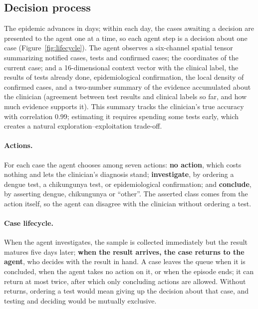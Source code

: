 \documentclass[11pt,a4paper]{article}
\begin{document}
\subsection{Decision process}
\label{subsec:mdp}

The epidemic advances in days; within each day, the cases awaiting a decision are presented to the agent one at a time, so each agent step is a decision about one case (Figure~\ref{fig:lifecycle}). The agent observes a six-channel spatial tensor summarizing notified cases, tests and confirmed cases; the coordinates of the current case; and a 16-dimensional context vector with the clinical label, the results of tests already done, epidemiological confirmation, the local density of confirmed cases, and a two-number summary of the evidence accumulated about the clinician (agreement between test results and clinical labels so far, and how much evidence supports it). This summary tracks the clinician's true accuracy with correlation 0.99; estimating it requires spending some tests early, which creates a natural exploration--exploitation trade-off.

\paragraph{Actions.} For each case the agent chooses among seven actions: \textbf{no action}, which costs nothing and lets the clinician's diagnosis stand; \textbf{investigate}, by ordering a dengue test, a chikungunya test, or epidemiological confirmation; and \textbf{conclude}, by asserting dengue, chikungunya or ``other''. The asserted class comes from the action itself, so the agent can disagree with the clinician without ordering a test.

\paragraph{Case lifecycle.} When the agent investigates, the sample is collected immediately but the result matures five days later; \textbf{when the result arrives, the case returns to the agent}, who decides with the result in hand. A case leaves the queue when it is concluded, when the agent takes no action on it, or when the episode ends; it can return at most twice, after which only concluding actions are allowed. Without returns, ordering a test would mean giving up the decision about that case, and testing and deciding would be mutually exclusive.
\end{document}
